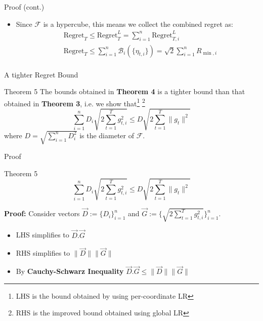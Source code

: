 \documentclass[
	11pt, %
]{beamer}
\begin{document}
\begin{frame}{Proof (cont.)}
    \begin{itemize}
        \item Since $\mathcal{F}$ is a hypercube, this means we collect the combined regret as:
        $$
        \begin{aligned}
            & \text{Regret}_T \le \text{Regret}_T^L = \sum_{i=1}^{n} \text{Regret}_{T,i}^L \\
            & \text{Regret}_T \le \sum_{i=1}^{n} \mathcal{B}_i \left({\{\eta_{t,i}\}}\right) = \sqrt{2} \sum_{i=1}^{n} R_{\min,i} \\
        \end{aligned}
        $$
    \end{itemize}
\end{frame}


\begin{frame}{A tighter Regret Bound}
    \begin{block}{Theorem 5}
        The bounds obtained in \textbf{Theorem 4} is a tighter bound than that obtained in \textbf{Theorem 3}, i.e. we show that\footnote{LHS is the bound obtained by using per-coordinate LR} \footnote{RHS is the improved bound obtained using global LR}
        $$
        \sum_{i=1}^{n} D_i\sqrt{2 \sum_{t=1}^{T} g_{t,i}^2} \le D \sqrt{2 \sum_{t=1}^{T} \|g_t\|^2}
        $$
        where $D = \sqrt{\sum_{i=1}^{n} D_i^2}$ is the diameter of $\mathcal{F}$.
    \end{block}
\end{frame}

\begin{frame}{Proof}
    \begin{block}{Theorem 5}
        $$
        \sum_{i=1}^{n} D_i\sqrt{2 \sum_{t=1}^{T} g_{t,i}^2} \le D \sqrt{2 \sum_{t=1}^{T} \|g_t\|^2}
        $$
    \end{block}
    \textbf{Proof:} Consider vectors $\vec{D} := \{D_i\}_{i=1}^{n}$ and $\vec{G} := \{\sqrt{2 \sum_{t=1}^{T} g_{t,i}^2}\}_{i=1}^{n}$.
    \begin{itemize}
        \item LHS simplifies to $\vec{D}.\vec{G}$
        \item RHS simplifies to $\|\vec{D}\|\|\vec{G}\|$
        \item By \textbf{Cauchy-Schwarz Inequality} $\vec{D}.\vec{G} \le \|\vec{D}\|\|\vec{G}\|$
    \end{itemize}
\end{frame}
\end{document}
